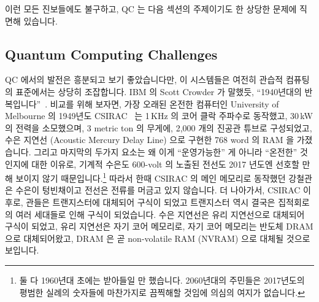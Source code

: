 이런 모든 진보들에도 불구하고, QC 는 다음 섹션의 주제이기도 한 상당한 문제에
직면해 있습니다.

\subsection{Quantum Computing Challenges}
\label{sec:future:Quantum Computing Challenges}

QC 에서의 발전은 흥분되고 보기 좋았습니다만, 이 시스템들은 여전히 관습적
컴퓨팅의 표준에서는 상당히 조잡합니다.
IBM 의 Scott Crowder 가 말했듯, ``1940년대의
반복입니다''~\cite{BradJones2017IBM-QC-Crowder}.
비교를 위해 보자면, 가장 오래된 온전한 컴퓨터인 University of Melbourne 의
1949년도 CSIRAC~\cite{CSIRACMuseumVictoria,CSIRACUniversityMelbourne} 는 1\,KHz
의 코어 클락 주파수로 동작했고, 30\,kW 의 전력을 소모했으며, 3 metric ton 의
무게에, 2,000 개의 진공관 튜브로 구성되었고, 수은 지연선 (Acoustic Mercury
Delay Line) 으로 구현한 768 word 의 RAM 을 가졌습니다.
그리고 마지막의 두가지 요소는 왜 이게 ``운영가능한'' 게 아니라 ``온전한''
것인지에 대한 이유로, 기계적 수은도 600-volt 의 노출된 전선도 2017 년도엔
선호할 만해 보이지 않기 때문입니다.\footnote{
	둘 다 1960년대 초에는 받아들일 만 했습니다.
	2060년대의 주민들은 2017년도의 평범한 실례의 숫자들에 마찬가지로
	끔찍해할 것임에 의심의 여지가 없습니다.}
따라서 한때 CSIRAC 의 메인 메모리로 동작했던 강철관은 수은이 텅빈채이고 전선은
전류를 머금고 있지 않습니다.
더 나아가서, CSIRAC 이후로, 관들은 트랜지스터에 대체되어 구식이 되었고
트랜지스터 역시 결국은 집적회로의 여러 세대들로 인해 구식이 되었습니다.
수은 지연선은 유리 지연선으로 대체되어 구식이 되었고, 유리 지연선은 자기 코어
메모리로, 자기 코어 메모리는 반도체 DRAM 으로 대체되어왔고, DRAM 은 곧
non-volatile RAM (NVRAM) 으로 대체될 것으로 보입니다.
\iffalse


